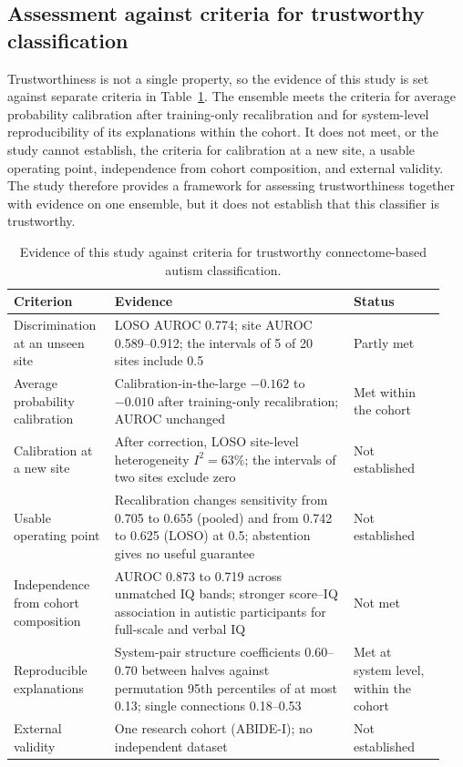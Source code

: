 \subsection{Assessment against criteria for trustworthy classification}
\label{subsec:trustworthiness}

Trustworthiness is not a single property, so the evidence of this study is set against separate criteria in Table~\ref{tab:trustworthiness}. The ensemble meets the criteria for average probability calibration after training-only recalibration and for system-level reproducibility of its explanations within the cohort. It does not meet, or the study cannot establish, the criteria for calibration at a new site, a usable operating point, independence from cohort composition, and external validity. The study therefore provides a framework for assessing trustworthiness together with evidence on one ensemble, but it does not establish that this classifier is trustworthy.

\begin{table}[t]
\centering
\caption{Evidence of this study against criteria for trustworthy connectome-based autism classification.}
\label{tab:trustworthiness}
\small
\begin{tabular}{@{}>{\raggedright\arraybackslash}p{0.22\linewidth}>{\raggedright\arraybackslash}p{0.52\linewidth}>{\raggedright\arraybackslash}p{0.20\linewidth}@{}}
\toprule
Criterion & Evidence & Status \\
\midrule
Discrimination at an unseen site & LOSO AUROC 0.774; site AUROC 0.589--0.912; the intervals of 5 of 20 sites include 0.5 & Partly met \\
Average probability calibration & Calibration-in-the-large $-0.162$ to $-0.010$ after training-only recalibration; AUROC unchanged & Met within the cohort \\
Calibration at a new site & After correction, LOSO site-level heterogeneity $I^2=63\%$; the intervals of two sites exclude zero & Not established \\
Usable operating point & Recalibration changes sensitivity from 0.705 to 0.655 (pooled) and from 0.742 to 0.625 (LOSO) at 0.5; abstention gives no useful guarantee & Not established \\
Independence from cohort composition & AUROC 0.873 to 0.719 across unmatched IQ bands; stronger score--IQ association in autistic participants for full-scale and verbal IQ & Not met \\
Reproducible explanations & System-pair structure coefficients 0.60--0.70 between halves against permutation 95th percentiles of at most 0.13; single connections 0.18--0.53 & Met at system level, within the cohort \\
External validity & One research cohort (ABIDE-I); no independent dataset & Not established \\
\bottomrule
\end{tabular}
\end{table}

